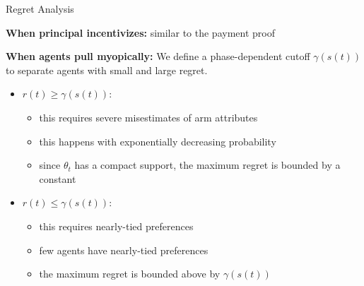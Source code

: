 \documentclass[serif]{beamer}
\begin{document}
\begin{frame}{Regret Analysis}

\textbf{When principal incentivizes:} similar to the payment proof
\vspace{0.5cm}

\textbf{When agents pull myopically:} We define a phase-dependent cutoff $\gamma(s(t))$ to separate agents with small and large regret.
\begin{itemize}[label=\textbullet]
\item $r(t)\geq \gamma(s(t))$:
\begin{itemize}[label=$\star$]
\item this requires severe misestimates of arm attributes
\item this happens with exponentially decreasing probability
\item since $\theta_t$ has a compact support, the maximum regret is bounded by a constant
\end{itemize}
\item $r(t)\leq \gamma(s(t))$:
\begin{itemize}[label=$\star$] 
\item this requires nearly-tied preferences 
\item few agents have nearly-tied preferences
\item the maximum regret is bounded above by $\gamma(s(t))$
\end{itemize}
\end{itemize}

\end{frame}
\end{document}

